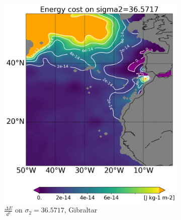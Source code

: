 \begin{figure}[htbp]
\begin{subfigure}[b]{0.4\textwidth}
         \includegraphics[width=\textwidth]{plots/energy/gibraltar_energy/Map2dcyl_energy_on_sigma2_3657e-2_reg310Eto360E05Nto57N_1990to1998av_WOCE.png}
         \caption{$\frac{\Delta E}{d^2}$ on $\sigma_2 = 36.5717$, Gibraltar}
         \label{fig:subplot_gibraltar_energy_sigma_2}
     \end{subfigure}
     \hfill
      \begin{subfigure}[b]{0.4\textwidth}
         

\end{subfigure}
\end{figure}
